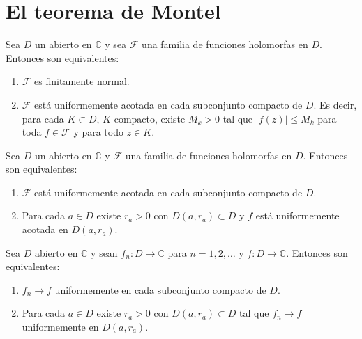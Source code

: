 \section{El teorema de Montel}
\begin{theorem}
    Sea $D$ un abierto en $\mathbb{C}$ y sea $\mathcal{F}$ una familia de funciones holomorfas en $D$.
    Entonces son equivalentes:
    \begin{enumerate}
        \item $\mathcal{F}$ es finitamente normal.
        \item $\mathcal{F}$ está uniformemente acotada en cada subconjunto compacto de $D$.
              Es decir, para cada $K \subset D$, $K$ compacto, existe $M_k > 0$ tal que $|f(z)| \leq M_k$ para toda $f \in \mathcal{F}$ y para todo $z \in K$.
    \end{enumerate}
\end{theorem}

\begin{lemma}
    Sea $D$ un abierto en $\mathbb{C}$ y $\mathcal{F}$ una familia de funciones holomorfas en $D$.
    Entonces son equivalentes:
    \begin{enumerate}
        \item $\mathcal{F}$ está uniformemente acotada en cada subconjunto compacto de $D$.
        \item Para cada $a \in D$ existe $r_a > 0$ con $D(a, r_a) \subset D$ y $f$ está uniformemente acotada en $D(a, r_a)$.
    \end{enumerate}
\end{lemma}

\begin{lemma}
    Sea $D$ abierto en $\mathbb{C}$ y sean $f_n: D \to \mathbb{C}$ para $n = 1, 2, \dots$ y $f: D \to \mathbb{C}$.
    Entonces son equivalentes:
    \begin{enumerate}
        \item $f_n \to f$ uniformemente en cada subconjunto compacto de $D$.
        \item Para cada $a \in D$ existe $r_a > 0$ con $D(a, r_a) \subset D$ tal que $f_n \to f$ uniformemente en $D(a, r_a)$.
    \end{enumerate}
\end{lemma}